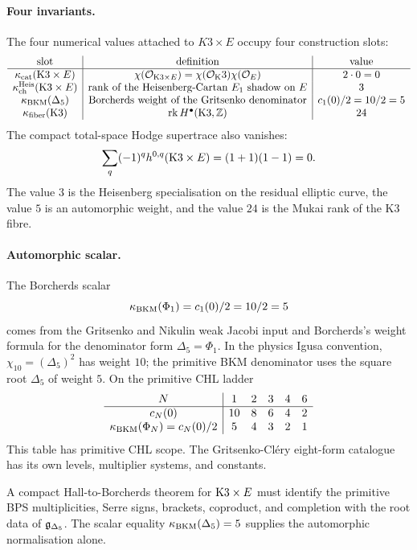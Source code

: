 \paragraph{Four invariants.}
The four numerical values attached to $K3\times E$ occupy four
construction slots:
\[
\begin{array}{c|c|c}
\text{slot} & \text{definition} & \text{value}\\ \hline
\kappa_{\mathrm{cat}}(\mathrm{K}3\times E) &
  \chi(\mathcal{O}_{\mathrm{K}3\times E})=\chi(\mathcal{O}_\mathrm{K}3)\chi(\mathcal{O}_E) &
  2\cdot 0 = 0\\
\kappa_{\mathrm{ch}}^{\mathrm{Heis}}(\mathrm{K}3\times E) &
  \text{rank of the Heisenberg-Cartan }E_1\text{ shadow on }E &
  3\\
\kappa_{\mathrm{BKM}}(\Delta_5) &
  \text{Borcherds weight of the Gritsenko denominator} &
  c_1(0)/2=10/2=5\\
\kappa_{\mathrm{fiber}}(\mathrm{K}3) &
  \operatorname{rk} H^\bullet(\mathrm{K}3,\mathbb Z) &
  24
\end{array}
\]
The compact total-space Hodge supertrace also vanishes:
\[
 \sum_q(-1)^q h^{0,q}(\mathrm{K}3\times E)
 = (1+1)(1-1)=0.
\]
The value $3$ is the Heisenberg specialisation on the residual elliptic
curve, the value $5$ is an automorphic weight, and the value $24$ is the
Mukai rank of the K3 fibre.

\paragraph{Automorphic scalar.}
The Borcherds scalar
\[
  \kappa_{\mathrm{BKM}}(\Phi_1)=c_1(0)/2=10/2=5
\]
comes from the Gritsenko and Nikulin weak Jacobi input and Borcherds's
weight formula for the denominator form $\Delta_5=\Phi_1$. In the
physics Igusa convention, $\chi_{10}=(\Delta_5)^2$ has weight $10$; the
primitive BKM denominator uses the square root $\Delta_5$ of weight $5$.
On the primitive CHL ladder
\[
\begin{array}{c|ccccc}
N & 1 & 2 & 3 & 4 & 6\\ \hline
c_N(0) & 10 & 8 & 6 & 4 & 2\\
\kappa_{\mathrm{BKM}}(\Phi_N)=c_N(0)/2 & 5 & 4 & 3 & 2 & 1
\end{array}
\]
This table has primitive CHL scope. The Gritsenko-Cl\'ery eight-form
catalogue has its own levels, multiplier systems, and constants.

A compact Hall-to-Borcherds theorem for $\mathrm{K}3\times E$ must identify the
primitive BPS multiplicities, Serre signs, brackets, coproduct, and
completion with the root data of $\mathfrak{g}_{\Delta_5}$. The scalar equality
$\kappa_{\mathrm{BKM}}(\Delta_5)=5$ supplies the automorphic normalisation alone.
